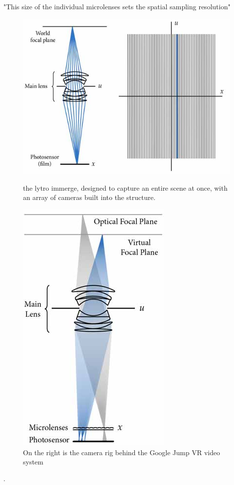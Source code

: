 \documentclass[12pt]{report}
\begin{document}
"This size of the individual microlenses sets the spatial sampling resolution"
\begin{figure}[!ht]
	\centering
	\begin{minipage}{0.45\textwidth}
		\centering
		\includegraphics[scale=0.4]{ng_typical.png}
		\caption{the lytro immerge, designed to capture an entire scene at once, with an array of cameras built into the structure.}
		\label{fig:ng_typical}
	\end{minipage}\hfill
	\begin{minipage}{0.45\textwidth}
		\centering
		\includegraphics[scale=0.32]{ng_plenoptic.png}
		\caption{On the right is the camera rig behind the Google Jump VR video system \cite{Anderson16}}
		\label{fig:ng_plenoptic}
	\end{minipage}
\end{figure}.
\end{document}

